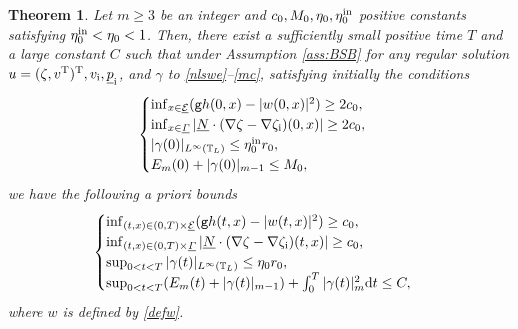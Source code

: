 \documentclass[JEP,XML,SOM,Unicode,NoFloatCountersInSection,published]{cedram}
\newcommand{\gr}{{\mathtt g}}
\newcommand{\cE}{{\mathcal E}}
\newcommand{\ul}[1]{\underline{#1}}
\newcommand{\itGamma}{\mathit{\Gamma}}
\newtheorem{theorem}{Theorem}[section]
\theoremstyle{definition}
\begin{document}
\begin{theorem}\label{th:main}
Let $m\geq3$ be an integer and $c_0, M_0, \eta_0, \eta_0^{\rm in}$ positive constants satisfying $\eta_0^{\rm in}<\eta_0<1$.
Then, there exist a sufficiently small positive time $T$ and a large constant $C$ such that under Assumption \ref{ass:BSB} for any regular solution
$u=(\zeta,v^{\rm T})^{\rm T},v_\mathrm{i},\ul{p}_\mathrm{i}$, and $\gamma$ to \eqref{nlswe}--\eqref{mc}, satisfying initially the conditions
\begin{equation}\label{EstIni}
\begin{cases}
\inf_{x\in\ul{\cE}}(\gr h(0,x)-|w(0,x)|^2) \geq 2c_0, \\
\inf_{x\in\ul{\itGamma}}| \ul{N}\cdot(\nabla\zeta-\nabla\zeta_\mathrm{i})(0,x)| \geq 2c_0, \\
|\gamma(0)|_{L^\infty(\mathbb{T}_L)} \leq \eta_0^{\rm in}r_0, \\
E_m(0) + |\gamma(0)|_{m-1} \leq M_0,
\end{cases}
\end{equation}
we have the following a priori bounds
\begin{equation}\label{APE}
\begin{cases}
\inf_{(t,x)\in(0,T)\times\ul{\cE}}(\gr h(t,x)-|w(t,x)|^2) \geq c_0, \\
\inf_{(t,x)\in(0,T)\times\ul{\itGamma}}| \ul{N}\cdot(\nabla\zeta-\nabla\zeta_\mathrm{i})(t,x)| \geq c_0, \\
\sup_{0<t<T}|\gamma(t)|_{L^\infty(\mathbb{T}_L)} \leq \eta_0r_0, \\
\sup_{0<t<T}(E_m(t) + |\gamma(t)|_{m-1}) + \int_0^T|\gamma(t)|_m^2{\rm d}t \leq C,
\end{cases}
\end{equation}
where $w$ is defined by \eqref{defw}.
\end{theorem}
\end{document}
